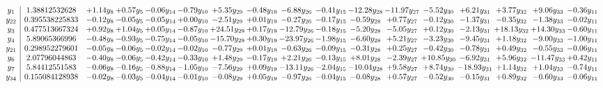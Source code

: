 \documentclass[9pt]{article}
\begin{document}
\[\begin{array}{c| c c@{\hskip 2pt} c@{\hskip 2pt} c@{\hskip 2pt} c@{\hskip 2pt} c@{\hskip 2pt} c@{\hskip 2pt} c@{\hskip 2pt} c@{\hskip 2pt} c@{\hskip 2pt} c@{\hskip 2pt} c@{\hskip 2pt} c@{\hskip 2pt} c@{\hskip 2pt} c@{\hskip 2pt} c@{\hskip 2pt} }
 y_{1}   &  1.38812532628 & +  1.14 y_{8} & +  0.57 y_{5} & -0.06 y_{14} & -0.79 y_{10} & +  5.35 y_{29} & -0.48 y_{19} & -6.88 y_{26} & -0.41 y_{15} & -12.28 y_{28} & -11.97 y_{27} & -5.52 y_{30} & +  6.21 y_{31} & +  3.77 y_{32} & +  9.06 y_{33} & -0.36 y_{11}\\
 y_{22}   &  0.395538225833 & -0.12 y_{8} & -0.05 y_{5} & -0.05 y_{14} & +  0.00 y_{10} & -2.51 y_{29} & +  0.01 y_{19} & -0.27 y_{26} & -0.17 y_{15} & -0.59 y_{28} & +  0.77 y_{27} & -0.12 y_{30} & -1.37 y_{31} & -0.35 y_{32} & -1.38 y_{33} & -0.02 y_{11}\\
 y_{3}   &  0.477513667324 & +  0.92 y_{8} & +  1.04 y_{5} & +  0.05 y_{14} & -0.87 y_{10} & + 24.51 y_{29} & +  0.17 y_{19} & -12.79 y_{26} & -0.18 y_{15} & -5.20 y_{28} & -5.05 y_{27} & +  0.12 y_{30} & -2.13 y_{31} & + 18.13 y_{32} & + 14.30 y_{33} & -0.60 y_{11}\\
 y_{4}   &  5.89065366996 & -0.48 y_{8} & -0.93 y_{5} & -0.75 y_{14} & -0.05 y_{10} & -15.70 y_{29} & +  0.30 y_{19} & -23.97 y_{26} & -1.98 y_{15} & -6.60 y_{28} & +  5.21 y_{27} & -3.23 y_{30} & -9.45 y_{31} & +  1.18 y_{32} & -9.00 y_{33} & -1.00 y_{11}\\
 y_{21}   &  0.298952279601 & -0.05 y_{8} & -0.06 y_{5} & -0.02 y_{14} & -0.02 y_{10} & -0.77 y_{29} & +  0.01 y_{19} & -0.63 y_{26} & -0.09 y_{15} & -0.31 y_{28} & +  0.25 y_{27} & -0.42 y_{30} & -0.78 y_{31} & +  0.49 y_{32} & -0.55 y_{33} & -0.06 y_{11}\\
 y_{6}   &  2.07796044863 & -0.40 y_{8} & -0.06 y_{5} & -0.42 y_{14} & -0.33 y_{10} & +  1.48 y_{29} & -0.17 y_{19} & +  2.21 y_{26} & -0.13 y_{15} & +  8.01 y_{28} & -2.39 y_{27} & + 10.85 y_{30} & -6.92 y_{31} & +  5.96 y_{32} & -11.47 y_{33} & +  0.42 y_{11}\\
 y_{7}   &  5.84412551583 & -0.06 y_{8} & -0.16 y_{5} & -0.88 y_{14} & -1.05 y_{10} & -7.56 y_{29} & +  0.09 y_{19} & -13.11 y_{26} & -2.04 y_{15} & -10.04 y_{28} & +  9.58 y_{27} & +  8.74 y_{30} & -18.93 y_{31} & +  1.14 y_{32} & +  1.04 y_{33} & -0.74 y_{11}\\
 y_{34}   &  0.155084128938 & -0.02 y_{8} & -0.03 y_{5} & -0.04 y_{14} & -0.01 y_{10} & -0.08 y_{29} & +  0.05 y_{19} & -0.97 y_{26} & -0.04 y_{15} & -0.08 y_{28} & +  0.57 y_{27} & -0.52 y_{30} & -0.15 y_{31} & +  0.89 y_{32} & -0.60 y_{33} & -0.06 y_{11}\\

\end{array}\]
\end{document}
